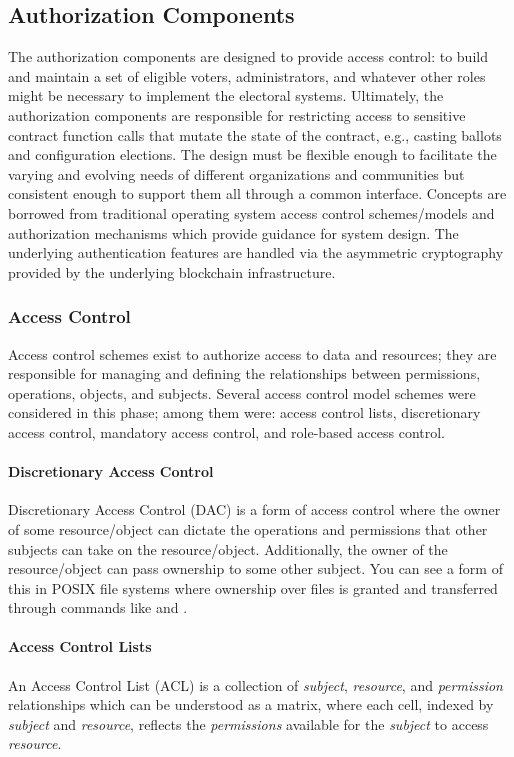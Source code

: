\subsection{Authorization Components}
The authorization components are designed to provide access control: to build
and maintain a set of eligible voters, administrators, and whatever other roles
might be necessary to implement the electoral systems. Ultimately, the
authorization components are responsible for restricting access to sensitive
contract function calls that mutate the state of the contract, e.g., casting
ballots and configuration elections. The design must be flexible enough to
facilitate the varying and evolving needs of different organizations and
communities but consistent enough to support them all through a common
interface. Concepts are borrowed from traditional operating system access
control schemes/models and authorization mechanisms which provide guidance for
system design. The underlying authentication features are handled via the
asymmetric cryptography provided by the underlying blockchain infrastructure.

\subsubsection{Access Control}
Access control schemes exist to authorize access to data and resources; they are
responsible for managing and defining the relationships between permissions,
operations, objects, and subjects. Several access control model schemes were
considered in this phase; among them were: access control lists, discretionary
access control, mandatory access control, and role-based access control.

\paragraph{Discretionary Access Control}
Discretionary Access Control (DAC) is a form of access control where the owner
of some resource/object can dictate the operations and permissions that other
subjects can take on the resource/object. Additionally, the owner of the
resource/object can pass ownership to some other subject. You can see a form of
this in POSIX file systems where ownership over files is granted and transferred
through commands like  and .

\paragraph{Access Control Lists}
An Access Control List (ACL) is a collection of \emph{subject}, \emph{resource},
and \emph{permission} relationships which can be understood as a matrix, where
each cell, indexed by \emph{subject} and \emph{resource}, reflects the
\emph{permissions} available for the \emph{subject} to access \emph{resource}.

